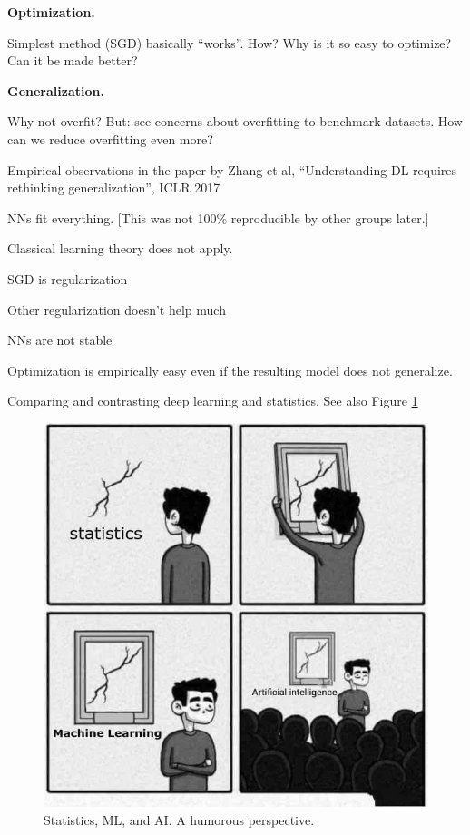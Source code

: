 \documentclass[english]{article}
\begin{document}
\item {\bf Optimization.}

Simplest method (SGD) basically ``works''. How? Why is it so easy to optimize? Can it be made better? 

\item {\bf Generalization.}

Why not overfit? But: see concerns about overfitting to benchmark datasets. How can we reduce overfitting even more? 

Empirical observations in the paper by Zhang et al, ``Understanding DL requires rethinking generalization'', ICLR 2017

\benum
\item NNs fit everything. [This was not 100\% reproducible by other groups later.]

Classical learning theory does not apply. 

\item SGD is regularization

Other regularization doesn't help much

\item NNs are not stable

\item Optimization is  empirically easy even if the resulting model does not generalize. 

\eenum




\item  Comparing and contrasting deep learning and statistics. See also Figure \ref{mlai}

\begin{figure}
  \centering
  \includegraphics[scale=0.2]{mlai.jpeg}
  \caption{Statistics, ML, and AI. A humorous perspective.}
  \label{mlai}
\end{figure}
\end{document}
